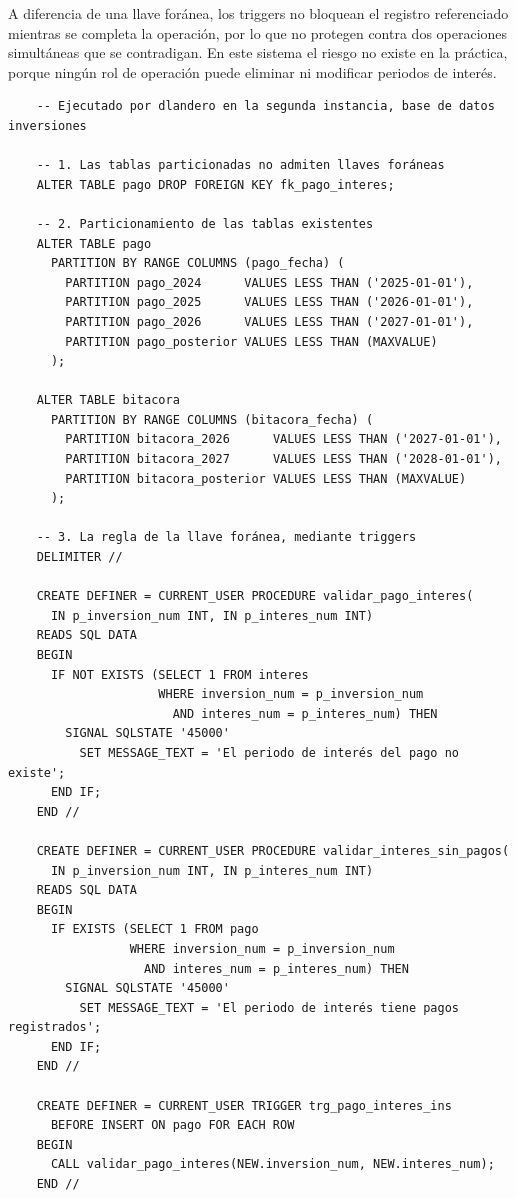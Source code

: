 A diferencia de una llave foránea, los triggers no bloquean el registro referenciado mientras se completa la operación, por lo que no protegen contra dos operaciones simultáneas que se contradigan. En este sistema el riesgo no existe en la práctica, porque ningún rol de operación puede eliminar ni modificar periodos de interés.

\begin{verbatim}
	-- Ejecutado por dlandero en la segunda instancia, base de datos inversiones
	
	-- 1. Las tablas particionadas no admiten llaves foráneas
	ALTER TABLE pago DROP FOREIGN KEY fk_pago_interes;
	
	-- 2. Particionamiento de las tablas existentes
	ALTER TABLE pago
	  PARTITION BY RANGE COLUMNS (pago_fecha) (
	    PARTITION pago_2024      VALUES LESS THAN ('2025-01-01'),
	    PARTITION pago_2025      VALUES LESS THAN ('2026-01-01'),
	    PARTITION pago_2026      VALUES LESS THAN ('2027-01-01'),
	    PARTITION pago_posterior VALUES LESS THAN (MAXVALUE)
	  );
	
	ALTER TABLE bitacora
	  PARTITION BY RANGE COLUMNS (bitacora_fecha) (
	    PARTITION bitacora_2026      VALUES LESS THAN ('2027-01-01'),
	    PARTITION bitacora_2027      VALUES LESS THAN ('2028-01-01'),
	    PARTITION bitacora_posterior VALUES LESS THAN (MAXVALUE)
	  );
	
	-- 3. La regla de la llave foránea, mediante triggers
	DELIMITER //
	
	CREATE DEFINER = CURRENT_USER PROCEDURE validar_pago_interes(
	  IN p_inversion_num INT, IN p_interes_num INT)
	READS SQL DATA
	BEGIN
	  IF NOT EXISTS (SELECT 1 FROM interes
	                 WHERE inversion_num = p_inversion_num
	                   AND interes_num = p_interes_num) THEN
	    SIGNAL SQLSTATE '45000'
	      SET MESSAGE_TEXT = 'El periodo de interés del pago no existe';
	  END IF;
	END //
	
	CREATE DEFINER = CURRENT_USER PROCEDURE validar_interes_sin_pagos(
	  IN p_inversion_num INT, IN p_interes_num INT)
	READS SQL DATA
	BEGIN
	  IF EXISTS (SELECT 1 FROM pago
	             WHERE inversion_num = p_inversion_num
	               AND interes_num = p_interes_num) THEN
	    SIGNAL SQLSTATE '45000'
	      SET MESSAGE_TEXT = 'El periodo de interés tiene pagos registrados';
	  END IF;
	END //
	
	CREATE DEFINER = CURRENT_USER TRIGGER trg_pago_interes_ins
	  BEFORE INSERT ON pago FOR EACH ROW
	BEGIN
	  CALL validar_pago_interes(NEW.inversion_num, NEW.interes_num);
	END //
	

\end{verbatim}
